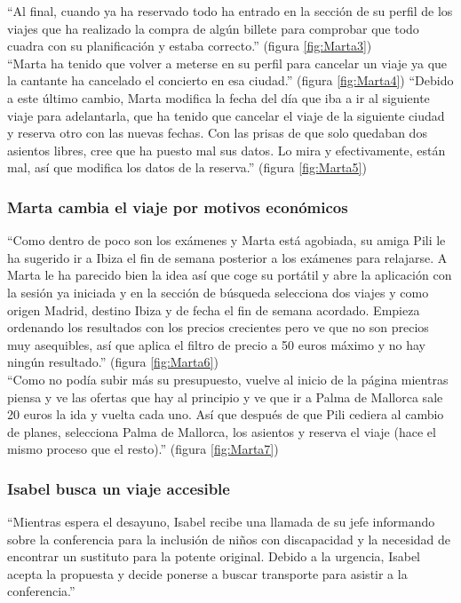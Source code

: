 “Al final, cuando ya ha reservado todo ha entrado en la sección de su perfil de los viajes que ha realizado la compra de algún billete para comprobar que todo 
cuadra con su planificación y estaba correcto.” (figura \ref{fig:Marta3}) \\

“Marta ha tenido que volver a meterse en su perfil para cancelar un viaje ya que la cantante ha cancelado el concierto en esa ciudad.” (figura \ref{fig:Marta4}) “Debido 
a este último cambio, Marta modifica la fecha del día que iba a ir al siguiente viaje para adelantarla, que ha tenido que cancelar el viaje de la siguiente ciudad 
y reserva otro con las nuevas fechas. Con las prisas de que solo quedaban dos asientos libres, cree que ha puesto mal sus datos. Lo mira y efectivamente, 
están mal, así que modifica los datos de la reserva.” (figura \ref{fig:Marta5}) \\


\subsubsection{Marta cambia el viaje por motivos económicos}
“Como dentro de poco son los exámenes y Marta está agobiada, su amiga Pili le ha sugerido ir a Ibiza el fin de semana posterior a los exámenes para relajarse. A 
Marta le ha parecido bien la idea así que coge su portátil y abre la aplicación con la sesión ya iniciada y en la sección de búsqueda selecciona dos viajes y 
como origen Madrid, destino Ibiza y de fecha el fin de semana acordado. Empieza ordenando los resultados con los precios crecientes pero ve que no son precios 
muy asequibles, así que aplica el filtro de precio a 50 euros máximo y no hay ningún resultado.” (figura \ref{fig:Marta6}) \\


“Como no podía subir más su presupuesto, vuelve al inicio de la página mientras piensa y ve las ofertas que hay al principio y ve que ir a Palma de Mallorca sale 
20 euros la ida y vuelta cada uno. Así que después de que Pili cediera al cambio de planes, selecciona Palma de Mallorca, los asientos y reserva el viaje 
(hace el mismo proceso que el resto).” (figura \ref{fig:Marta7})

\subsubsection{Isabel busca un viaje accesible}
“Mientras espera el desayuno, Isabel recibe una llamada de su jefe informando sobre la conferencia para la inclusión de niños con discapacidad y la necesidad de 
encontrar un sustituto para la potente original. Debido a la urgencia, Isabel acepta la propuesta y decide ponerse a buscar transporte para asistir a la conferencia.” \\

